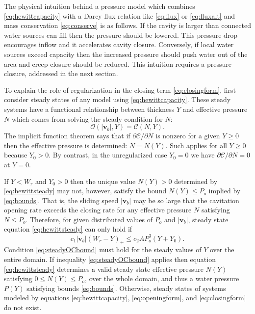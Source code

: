 \documentclass[11pt,final]{amsart}%
\newcommand\bv{\mathbf{v}}
\begin{document}
The physical intuition behind a pressure model which combines \eqref{eq:hewittcapacity} with a Darcy flux relation like \eqref{eq:flux} or \eqref{eq:fluxalt} and mass conservation \eqref{eq:conserve} is as follows.  If the cavity is larger than connected water sources can fill then the pressure should be lowered.  This pressure drop encourages inflow and it accelerates cavity closure.  Conversely, if local water sources exceed capacity then the increased pressure should push water out of the area and creep closure should be reduced.  This intuition requires a pressure closure, addressed in the next section.

To explain the role of regularization in the closing term \eqref{eq:closingform}, first consider steady states of any model using \eqref{eq:hewittcapacity}.  These steady systems have a functional relationship between thickness $Y$ and effective pressure $N$ which comes from solving the steady condition for $N$:
\begin{equation}
\mathcal{O}(|\bv_b|,Y) = \mathcal{C}(N,Y). \label{eq:hewittsteady}
\end{equation}
The implicit function theorem says that if $\partial\mathcal{C}/\partial N$ is nonzero for a given $Y\ge 0$ then the effective pressure is determined: $N=N(Y)$.  Such applies for all $Y\ge 0$ because $Y_0>0$.  By contrast, in the unregularized case $Y_0=0$ we have $\partial\mathcal{C}/\partial N=0$ at $Y=0$.

If $Y<W_r$ and $Y_0>0$ then the unique value $N(Y)>0$ determined by \eqref{eq:hewittsteady} may not, however, satisfy the bound $N(Y) \le P_o$ implied by \eqref{eq:bounds}.  That is, the sliding speed $|\bv_b|$ may be so large that the cavitation opening rate exceeds the closing rate for any effective pressure $N$ satisfying $N\le P_o$.  Therefore, for given distributed values of $P_o$ and $|\bv_b|$, steady state equation \eqref{eq:hewittsteady} can only hold if
\begin{equation}
c_1 |\bv_b| (W_r - Y)_+ \le c_2 A P_o^3 (Y+Y_0). \label{eq:steadyOCbound}
\end{equation}
Condition \eqref{eq:steadyOCbound} must hold for the steady values of $Y$ over the entire domain.  If inequality \eqref{eq:steadyOCbound} applies then equation \eqref{eq:hewittsteady} determines a valid steady state effective pressure $N(Y)$ satisfying $0\le N(Y) \le P_o$, over the whole domain, and thus a water pressure $P(Y)$ satisfying bounds \eqref{eq:bounds}.  Otherwise, steady states of systems modeled by equations \eqref{eq:hewittcapacity}, \eqref{eq:openingform}, and \eqref{eq:closingform} do not exist.
\end{document}
